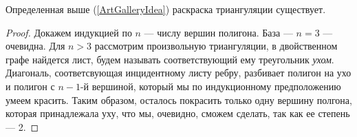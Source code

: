 \begin{statement}
  Определенная выше (\ref{ArtGalleryIdea}) раскраска триангуляции существует.
\end{statement}
\begin{proof}
  Докажем индукцией по $n$ --- числу вершин полигона. База --- $n = 3$ --- очевидна. 
  Для $n > 3$ рассмотрим произвольную триангуляции, в двойственном графе найдется лист, будем называть соответствующий ему треугольник \textit{ухом}.
  Диагональ, соответсвующая инцидентному листу ребру, разбивает полигон на ухо и полигон с $n-1$-й вершиной, 
  который мы по индукционному предположению умеем красить. Таким образом, осталось покрасить только одну вершину полгона, 
  которая принадлежала уху, что мы, очевидно, сможем сделать, так как ее степень --- 2.
\end{proof}